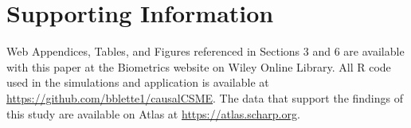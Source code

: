 \documentclass[useAMS,usenatbib,referee]{biom}
\begin{document}







\section*{Supporting Information}

Web Appendices, Tables, and Figures referenced in Sections 3 and 6 are available with this paper at the Biometrics website on Wiley Online Library. All R code used in the simulations and application is available at \href{https://github.com/bblette1/causalCSME}{https://github.com/bblette1/causalCSME}. The data that support the findings of this study are available on Atlas at \href{https://atlas.scharp.org/cpas/project/HVTN\%20Public\%20Data/HVTN\%20505/begin.view}{https://atlas.scharp.org}.\vspace*{-8pt}

\label{lastpage}
\end{document}
